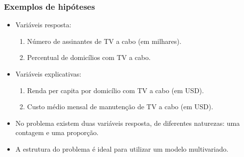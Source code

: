 \documentclass[10pt,
  aspectratio=169,
  serif,
  mathserif,
  professionalfont,
  compress,
  handout,
  ]{beamer}\usepackage[]{graphicx}\usepackage[]{color}
\begin{document}

\begin{frame}

\frametitle{Exemplos de hipóteses}

\begin{itemize}
  
  \itemsep 2ex
  
  \item Variáveis resposta:
  
    \begin{enumerate}
      \item Número de assinantes de TV a cabo (em milhares).
      \item Percentual de domicílios com TV a cabo.
    \end{enumerate}
    
  \item Variáveis explicativas:
  
    \begin{enumerate}
      \item Renda per capita por domicílio com TV a cabo (em USD).
      \item Custo médio mensal de manutenção de TV a cabo (em USD).
    \end{enumerate}
  
  \item No problema existem duas variáveis resposta, de diferentes naturezas: uma contagem e uma proporção.
  
  \item A estrutura do problema é ideal para utilizar um modelo multivariado.
  
\end{itemize}

\end{frame}

\end{document}
